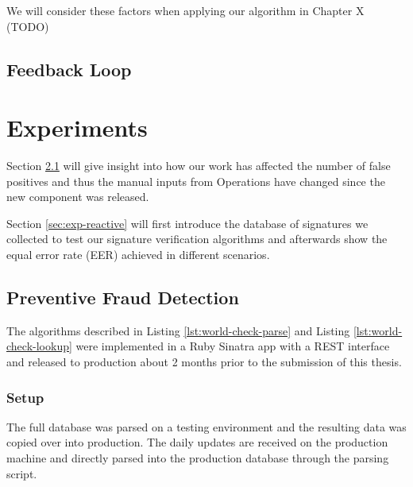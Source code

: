 \documentclass[a4paper, oneside]{csthesis}
\begin{document}
We will consider these factors when applying our algorithm in Chapter X (TODO)


\section{Feedback Loop}




















\chapter{Experiments}




Section \ref{sec:exp-preventive} will give insight into how our work has affected the number of false positives and thus the manual inputs from Operations have changed since the new component was released.

Section \ref{sec:exp-reactive} will first introduce the database of signatures we collected to test our signature verification algorithms and afterwards show the equal error rate (EER) achieved in different scenarios.


\section{Preventive Fraud Detection}
\label{sec:exp-preventive}

The algorithms described in Listing \ref{lst:world-check-parse} and Listing \ref{lst:world-check-lookup} were implemented in a Ruby Sinatra app with a REST interface and released to production about 2 months prior to the submission of this thesis.

\subsection{Setup}

The full database was parsed on a testing environment and the resulting data was copied over into production. The daily updates are received on the production machine and directly parsed into the production database through the parsing script.
\end{document}
